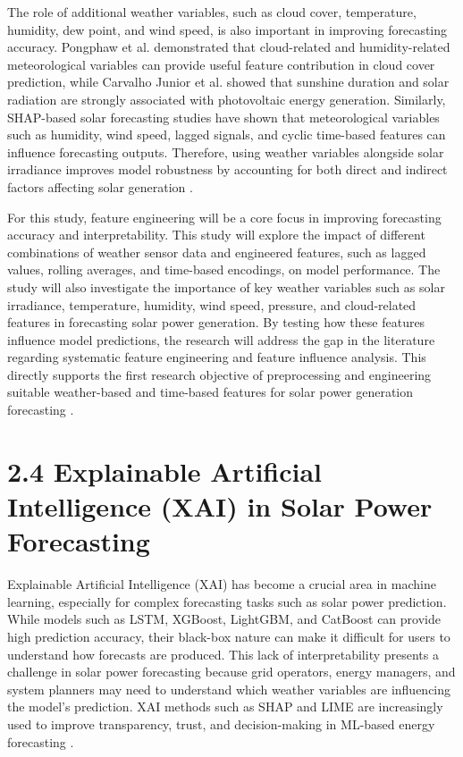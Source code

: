 The role of additional weather variables, such as cloud cover, temperature, humidity, dew point, and wind speed, is also important in improving forecasting accuracy. Pongphaw et al. demonstrated that cloud-related and humidity-related meteorological variables can provide useful feature contribution in cloud cover prediction, while Carvalho Junior et al. showed that sunshine duration and solar radiation are strongly associated with photovoltaic energy generation. Similarly, SHAP-based solar forecasting studies have shown that meteorological variables such as humidity, wind speed, lagged signals, and cyclic time-based features can influence forecasting outputs. Therefore, using weather variables alongside solar irradiance improves model robustness by accounting for both direct and indirect factors affecting solar generation \parencite{Pongphaw2025, CarvalhoJunior2025, Eren2025, TsaiLo2025, Duvuru2026}.

For this study, feature engineering will be a core focus in improving forecasting accuracy and interpretability. This study will explore the impact of different combinations of weather sensor data and engineered features, such as lagged values, rolling averages, and time-based encodings, on model performance. The study will also investigate the importance of key weather variables such as solar irradiance, temperature, humidity, wind speed, pressure, and cloud-related features in forecasting solar power generation. By testing how these features influence model predictions, the research will address the gap in the literature regarding systematic feature engineering and feature influence analysis. This directly supports the first research objective of preprocessing and engineering suitable weather-based and time-based features for solar power generation forecasting \parencite{CarvalhoJunior2025, TsaiLo2025, JnanaVarshitha2025, Pongphaw2025}.



\section{2.4 Explainable Artificial Intelligence (XAI) in Solar Power Forecasting}

Explainable Artificial Intelligence (XAI) has become a crucial area in machine learning, especially for complex forecasting tasks such as solar power prediction. While models such as LSTM, XGBoost, LightGBM, and CatBoost can provide high prediction accuracy, their black-box nature can make it difficult for users to understand how forecasts are produced. This lack of interpretability presents a challenge in solar power forecasting because grid operators, energy managers, and system planners may need to understand which weather variables are influencing the model's prediction. XAI methods such as SHAP and LIME are increasingly used to improve transparency, trust, and decision-making in ML-based energy forecasting \parencite{JnanaVarshitha2025, Eren2025, TsaiLo2025, Duvuru2026}.

